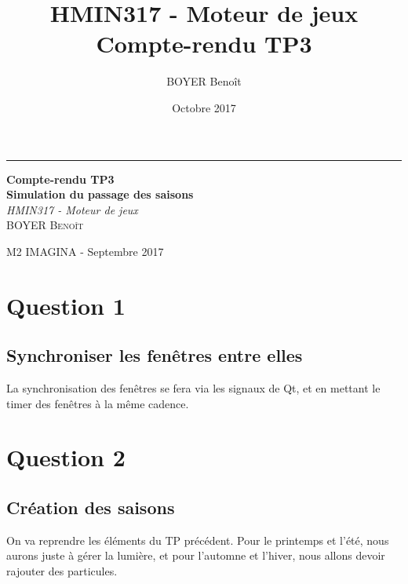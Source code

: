 \documentclass[a4paper,11pt]{report}
\title{HMIN317 - Moteur de jeux \\ Compte-rendu TP3}
\author{BOYER Benoît}
\date{Octobre 2017}
\begin{document}
  	  \begin{titlepage} %
	
	  \raggedleft %
	
	  \rule{1pt}{\textheight} %
	  \hspace{0.05\textwidth} %
	  \parbox[b]{0.75\textwidth}{ %
		
		  {\Huge\bfseries Compte-rendu TP3 \\[0.5\baselineskip] Simulation du passage des saisons}\\[2\baselineskip] %
		  {\large\textit{HMIN317 - Moteur de jeux}}\\[4\baselineskip] %
		  {\Large\textsc{BOYER Benoît}} %
		
		  \vspace{0.5\textheight} %
		
		  {\noindent M2 IMAGINA - Septembre 2017}\\[\baselineskip] %
	  }

  \end{titlepage}
  
    \tableofcontents
	\pagebreak


    \section{Question 1}
    \subsection{Synchroniser les fenêtres entre elles}
	La synchronisation des fenêtres se fera via les signaux de Qt, et en mettant le timer des fenêtres à la même cadence.

	\section{Question 2}
	\subsection{Création des saisons}
	On va reprendre les éléments du TP précédent. Pour le printemps et l'été, nous aurons juste à gérer la lumière, et pour l'automne et l'hiver, nous allons devoir rajouter des particules.
\end{document}
